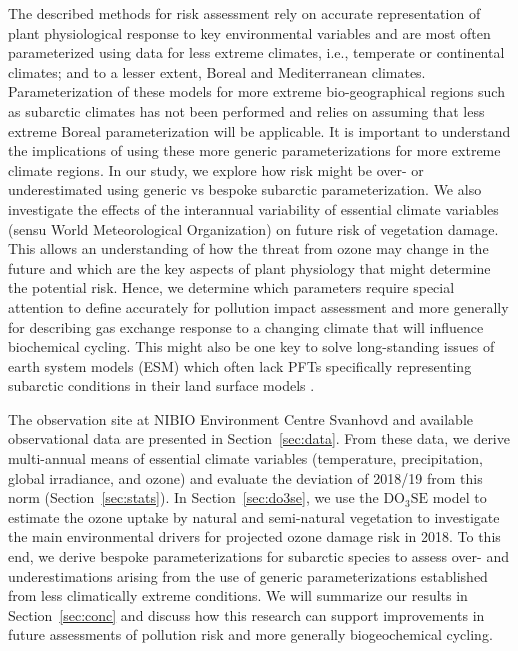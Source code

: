 \documentclass[bg, manuscript]{copernicus}
\begin{document}
The described methods for risk assessment rely on accurate representation of plant physiological response to key environmental variables and are most often parameterized using data for less extreme climates, i.e., temperate or continental climates; and to a lesser extent, Boreal and Mediterranean climates. Parameterization of these models for more extreme bio-geographical regions such as subarctic climates has not been performed and relies on assuming that less extreme Boreal parameterization will be applicable. It is important to understand the implications of using these more generic parameterizations for more extreme climate regions. In our study, we explore how risk might be over- or underestimated using generic vs bespoke subarctic parameterization. We also investigate the effects of the interannual variability of essential climate variables (sensu World Meteorological Organization) on future risk of vegetation damage.
This allows an understanding of how the threat from ozone may change in the future and which are the key aspects of plant physiology that might determine the potential risk. Hence, we determine which parameters require special attention to define accurately for pollution impact assessment and more generally for describing gas exchange response to a changing climate that will influence biochemical cycling. This might also be one key to solve long-standing issues of earth system models (ESM) which often lack PFTs specifically representing subarctic conditions in their land surface models \citep{GMD:Poulter2015,JAMES:Lawrence2019}. 

The observation site at NIBIO Environment Centre Svanhovd and available observational data are presented in Section~\ref{sec:data}. From these data, we derive multi-annual means of essential climate variables (temperature, precipitation, global irradiance, and ozone) and evaluate the deviation of 2018/19 from this norm (Section~\ref{sec:stats}). In Section~\ref{sec:do3se}, we use the $\mathrm{DO_3SE}$ model to estimate the ozone uptake by natural and semi-natural vegetation to investigate the main environmental drivers for projected ozone damage risk in 2018. To this end, we derive bespoke parameterizations for subarctic species to assess over- and underestimations arising from the use of generic parameterizations established from less climatically extreme conditions. We will summarize our results in Section~\ref{sec:conc} and discuss how this research can support improvements in future assessments of pollution risk and more generally biogeochemical cycling.
\end{document}
